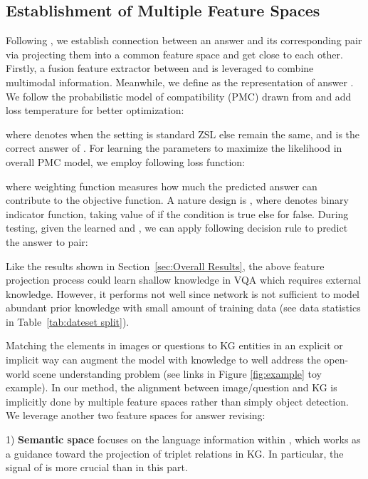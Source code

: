 \documentclass[runningheads]{llncs}
\begin{document}
\subsection{Establishment of Multiple Feature Spaces} \label{sec:feature Spaces}
Following \cite{DBLP:conf/cvpr/HuCS18}, we establish connection between an answer and its corresponding  pair via projecting them into a common feature space and get close to each other.
Firstly, a fusion feature extractor  between  and  is leveraged to combine multimodal information.
Meanwhile, we define  
as the representation of answer .
We follow the probabilistic model of compatibility (PMC) drawn from \cite{DBLP:conf/cvpr/HuCS18} and add loss temperature  for better optimization:

where  denotes  when the setting is standard ZSL else remain the same, and  is the correct answer of .
For learning the parameters to maximize the likelihood in overall PMC model, we employ following loss function:

where weighting function  measures how much the predicted answer  can contribute to the objective function. A nature design is
, 
where  denotes binary indicator function, taking value of  if the condition is true else  for false. 
During testing, 
given the learned  and , 
we can apply following decision rule to predict the answer  to  pair:


Like the results shown in Section~\ref{sec:Overall Results}, the above feature projection process could learn shallow knowledge in VQA which requires external knowledge. 
However, it performs not well since network is not sufficient to model abundant prior knowledge with small amount of training data (see data statistics in Table~\ref{tab:dateset split}).

Matching the elements in images or questions to KG entities in an explicit \cite{DBLP:journals/pami/WangWSDH18} or implicit \cite{DBLP:journals/ivc/FaraziKB20} way can augment the model with knowledge to well address the open-world scene understanding problem (see links in Figure \ref{fig:example} toy example). In our method, the alignment between image/question and KG is implicitly done by multiple feature spaces rather than simply object detection. We leverage another two feature spaces for answer revising:

1) \textbf{Semantic space} focuses on the language information within , which works as a guidance toward the projection of triplet relations  in KG. In particular, the signal of  is more crucial than  in this part.
\end{document}
